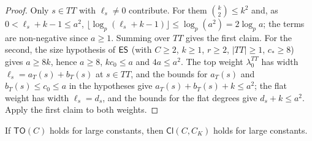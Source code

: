 \begin{proof}
Only $s\in TT$ with $\ell_s\ne0$ contribute. For them $\binom k2\le k^2$ and, as $0<\ell_s+k-1\le a^2$,
$\lfloor\log_p(\ell_s+k-1)\rfloor\le\log_p(a^2)=2\log_pa$; the terms are non-negative since $a\ge1$. Summing over $TT$ gives
the first claim. For the second, the size hypothesis of $\mathsf{ES}$ (with $C\ge2$, $k\ge1$, $r\ge2$, $|TT|\ge1$, $c_*\ge8$)
gives $a\ge8k$, hence $a\ge8$, $kc_0\le a$ and $4a\le a^2$. The top weight $\lambda_0^{TT}$ has width $\ell_s=a_T(s)+b_T(s)$ at
$s\in TT$, and the bounds for $a_T(s)$ and $b_T(s)\le c_0\le a$ in the hypotheses give $a_T(s)+b_T(s)+k\le a^2$; the flat weight
has width $\ell_s=d_s$, and the bounds for the flat degrees give $d_s+k\le a^2$. Apply the first claim to both weights.
\end{proof}

\begin{proposition}\label{pf:linkG:cloudb}
If $\mathsf{TO}(C)$ holds for large constants, then $\mathsf{Cl}(C,C_K)$ holds for large constants.
\end{proposition}

